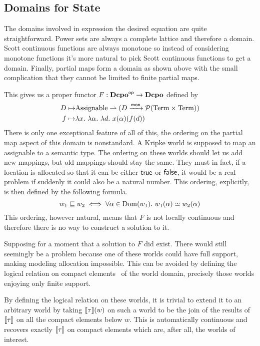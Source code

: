 \subsection{Domains for State}

The domains involved in expression the desired equation are quite
straightforward. Power sets are always a complete lattice and
therefore a domain. Scott continuous functions are always monotone so
instead of considering monotone functions it's more natural to pick
Scott continuous functions to get a domain. Finally, partial maps form
a domain as shown above with the small complication that they cannot
be limited to finite partial maps.

This gives us a proper functor $F : \mathbf{Dcpo}^{\mathsf{op}} \to \mathbf{Dcpo}$ defined by
\begin{align*}
  D \mapsto& \assignables \pto (D \mto \pow{\term \times \term})\\
  f \mapsto& \lambda x.\ \lambda \alpha.\ \lambda d.\ x(\alpha)(f(d))
\end{align*}
There is only one exceptional feature of all of this, the ordering on
the partial map aspect of this domain is nonstandard. A Kripke world
is supposed to map an assignable to a semantic type. The ordering on
these worlds should let us add new mappings, but old mappings should
stay the same. They must in fact, if a location is allocated so that
it can be either $\mathsf{true}$ or $\mathsf{false}$, it would be a real
problem if suddenly it could also be a natural number. This ordering,
explicitly, is then defined by the following formula.
\[
  w_1 \mathrel{\sqsubseteq} w_2 \iff \forall \alpha \in \operatorname{Dom}(w_1).\ w_1(\alpha) \simeq w_2(\alpha)
\]
This ordering, however natural, means that $F$ is not locally
continuous and therefore there is no way to construct a solution to
it.

Supposing for a moment that a solution to $F$ did exist. There would
still seemingly be a problem because one of these worlds could have
full support, making modeling allocation impossible. This can be
avoided by defining the logical relation on compact
elements~\citep{Girez:03} of the world domain, precisely those worlds
enjoying only finite support.

By defining the logical relation on these worlds, it is trivial to
extend it to an arbitrary world by taking $\llbracket \tau \rrbracket(w)$ on such a
world to be the join of the results of $\llbracket \tau \rrbracket$ on all the compact
elements below $w$. This is automatically continuous and recovers
exactly $\llbracket \tau \rrbracket$ on compact elements which are, after all, the
worlds of interest.

